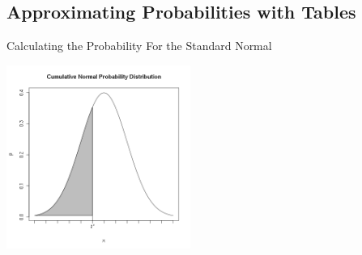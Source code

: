 \subsection{Approximating Probabilities with Tables}

\begin{frame}{Calculating the Probability For the Standard Normal}

  \includegraphics[width=6cm]{img/cummulativeDist}
  
\end{frame}

